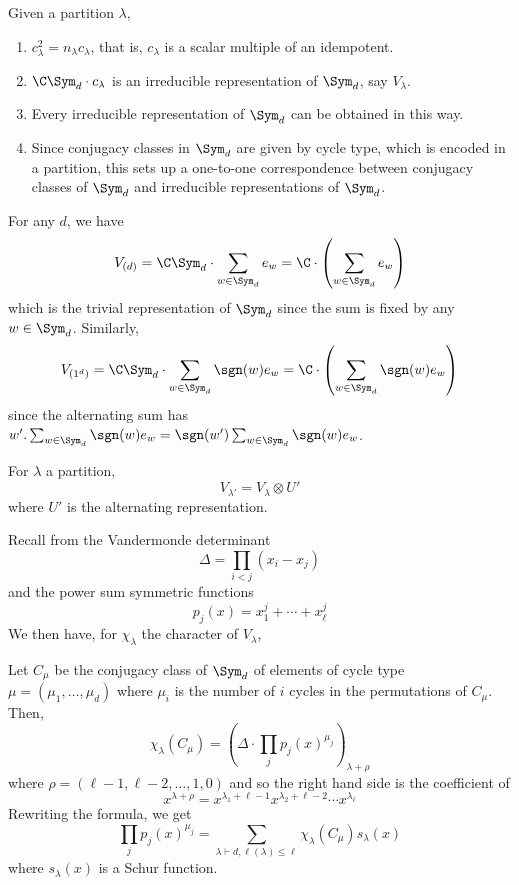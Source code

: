\documentclass[11pt,leqno,oneside]{amsart}
\numberwithin{thm}{section}
\newcommand{\Vdet}{\Delta}
\newcommand{\partitionof}{\vdash}
\newcommand{\rowshift}{\rho}
\begin{document}
\begin{thm}
  Given a partition \(\lambda\),
  \begin{enumerate}
  \item \(c_\lambda^2 = n_\lambda c_\lambda\), that is, \(c_\lambda\)
    is a scalar multiple of an idempotent.
  \item \(\C \Sym_d \cdot c_\lambda\) is an irreducible representation
    of \(\Sym_d\), say \(V_\lambda\).
  \item Every irreducible representation of \(\Sym_d\) can be obtained
    in this way.
  \item Since conjugacy classes in \(\Sym_d\) are given by cycle type,
    which is encoded in a partition, this sets up a one-to-one
    correspondence between conjugacy classes of \(\Sym_d\) and
    irreducible representations of \(\Sym_d\).
  \end{enumerate}
\end{thm}
\begin{prop}
  For any \(d\), we have \[
    V_{(d)} = \C \Sym_d \cdot \sum_{w \in \Sym_d} e_w = \C\cdot\left(
      \sum_{w \in \Sym_d} e_w \right)
  \]
  which is the trivial representation of \(\Sym_d\) since the sum is
  fixed by any \(w \in \Sym_d\). Similarly, \[
    V_{(1^d)} = \C \Sym_d \cdot \sum_{w \in \Sym_d} \sgn(w) e_w = \C
    \cdot \left( \sum_{w \in \Sym_d} \sgn(w)e_w \right)
  \]
  since the alternating sum has \(w'.\sum_{w \in \Sym_d} \sgn(w)e_w =
  \sgn(w') \sum_{w \in \Sym_d} \sgn(w) e_w\).
\end{prop}
\begin{prop}
  For \(\lambda\) a partition, \[
    V_{\lambda'} = V_\lambda \otimes U'
  \]
  where \(U'\) is the alternating representation.
\end{prop}
Recall from \cite{alg-comb} the Vandermonde determinant \[
  \Vdet = \prod_{i < j}(x_i-x_j)
\]
and the power sum symmetric functions \[
  p_j(x) = x_1^j + \cdots + x_\ell^j
\]
We then have, for \(\chi_\lambda\) the character of \(V_\lambda\),
\begin{thm}
  Let \(C_\mu\) be the conjugacy class of \(\Sym_d\) of elements of
  cycle type \(\mu = (\mu_1, \ldots, \mu_d)\) where \(\mu_i\) is the
  number of \(i\) cycles in the permutations of \(C_\mu\). Then, \[
    \chi_\lambda(C_\mu) = \left( \Vdet \cdot \prod_j p_j(x)^{\mu_j}
    \right)_{\lambda+\rowshift}
  \]
  where \(\rowshift = (\ell-1, \ell-2,\ldots,1,0)\) and so the right
  hand side is the coefficient of \[
    x^{\lambda+\rowshift} = x^{\lambda_1+\ell-1}x^{\lambda_2+\ell-2}
    \cdots x^{\lambda_\ell}
  \]
  Rewriting the formula, we get \[
    \prod_j p_j(x)^{\mu_j} = \sum_{\lambda \partitionof d,
      \ell(\lambda) \leq \ell} \chi_\lambda(C_\mu) s_\lambda(x)
  \]
  where \(s_\lambda(x)\) is a Schur function.
\end{thm}
\end{document}
